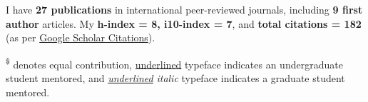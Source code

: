 

\hfill
\par

I have \textbf{27 publications} in international peer-reviewed journals, including \textbf{9 first author} articles. My \textbf{h-index = 8, i10-index = 7}, and \textbf{total citations = 182} (as per \href{https://scholar.google.com/citations?user=kvf8JJQAAAAJ&hl=en}{Google Scholar Citations}).
\nocite{*}

\begin{footnotesize}  
    \textsuperscript{\$} denotes equal contribution, \underline{underlined} typeface indicates an undergraduate student mentored, and \textit{\underline{underlined}} \textit{italic} typeface indicates
     a graduate student mentored.
    \end{footnotesize}

\printbibliography[heading={subbibliography},title={Journal Articles},type=article]
\printbibliography[heading={subbibliography},title={Under Review},type=unpublished]
\printbibliography[heading={subbibliography},title={Manuals},type=manual]
\printbibliography[heading={subbibliography},title={Abstract / Oral / Conferences},type=inbook]
\printbibliography[heading={subbibliography},title={Other Conferences and Workshops },type=misc]





